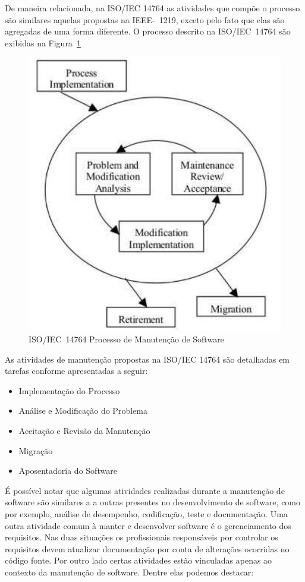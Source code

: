 De maneira relacionada, na ISO/IEC 14764 as atividades que compõe o processo são
similares aquelas propostas na IEEE-~1219, exceto pelo fato que elas são
agregadas de uma forma diferente. O processo descrito na ISO/IEC~14764 são
exibidas na Figura~\ref{fig:ieee-14764-processo-manutencao}

\begin{figure}[htpb]
	\centering
	\includegraphics[width=0.8\linewidth]{chapter-manutencao-software-visao-geral/img/ieee-14764-processo-manutencao.pdf}
	\caption{ISO/IEC~14764 Processo de Manutenção de Software}
	\label{fig:ieee-14764-processo-manutencao}
\end{figure}

As atividades de manutenção propostas na ISO/IEC 14764 são detalhadas em tarefas
conforme apresentadas a seguir:

\begin{itemize}
	\item Implementação do Processo
	\item Análise e Modificação do Problema
	\item Aceitação e Revisão da Manutenção
	\item Migração
	\item Aposentadoria do Software	
\end{itemize}

É possível notar que algumas atividades realizadas durante a manutenção de
software são similares a a outras presentes no desenvolvimento de software, como
por exemplo, análise de desempenho, codificação, teste e documentação. Uma outra
atividade comum à manter e desenvolver software é o gerenciamento dos
requisitos. Nas duas situações os profissionais responsáveis por controlar os
requisitos devem atualizar documentação  por conta de alterações ocorridas no
código fonte. Por outro lado certas atividades estão vinculadas apenas ao
contexto da manutenção de software. Dentre elas podemos destacar:

